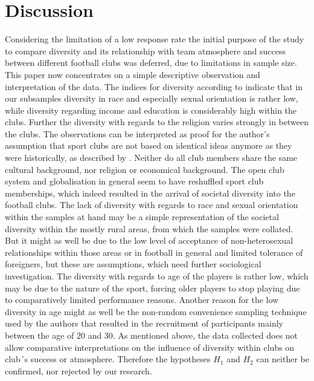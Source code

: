 \documentclass[	
	12pt, %
	a4paper, %
]{scrartcl}\usepackage[]{graphicx}\usepackage[]{color}
\begin{document}
\section{Discussion}
\label{sec:discussion}
Considering the limitation of a low response rate the initial purpose of the study to compare diversity and its relationship with team atmosphere and success between different football clubs was deferred, due to limitations in sample size. This paper now concentrates on a simple descriptive observation and interpretation of the data.
The indices for diversity according to  indicate that in our subsamples diversity in race and especially sexual orientation is rather low, while diversity regarding income and education is considerably high within the clubs. Further the diversity with regards to the religion varies strongly in between the clubs. The observations can be interpreted as proof for the author’s assumption that sport clubs are not based on identical ideas anymore as they were historically, as described by . Neither do all club members share the same cultural background, nor religion or economical background. The open club system and globalisation in general seem to have reshuffled sport club memberships, which indeed resulted in the arrival of societal diversity into the football clubs. The lack of diversity with regards to race and sexual orientation within the samples at hand may be a simple representation of the societal diversity within the mostly rural areas, from which the samples were collated. But it might as well be due to the low level of acceptance of non-heterosexual relationships within those areas or in football in general and limited tolerance of foreigners, but these are assumptions, which need further sociological investigation. 
The diversity with regards to age of the players is rather low, which may be due to the nature of the sport, forcing older players to stop playing due to comparatively limited performance reasons. Another reason for the low diversity in age might as well be the non-random convenience sampling technique used by the authors that resulted in the recruitment of participants mainly between the age of 20 and 30.
As mentioned above, the data collected does not allow comparative interpretations on the influence of diversity within clubs on club´s success or atmosphere. Therefore the hypotheses $H_{1}$ and $H_{2}$ can neither be confirmed, nor rejected by our research. 
\end{document}
